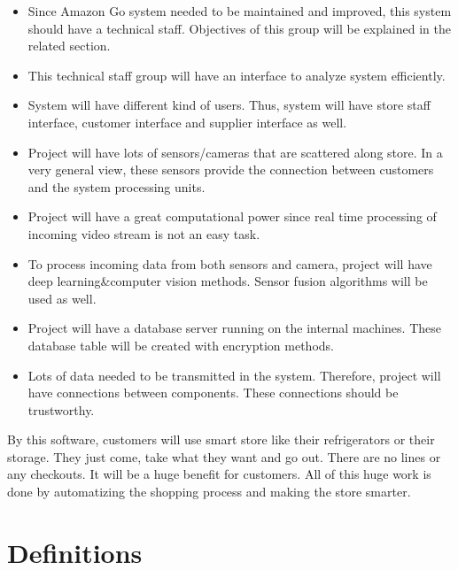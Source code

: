 \begin{itemize}
    \item Since Amazon Go system needed to be maintained and improved, this system should have a technical staff. Objectives of this group will be explained in the related section.
    \item This technical staff group will have an interface to analyze system efficiently.
    \item System will have different kind of users. Thus, system will have store staff interface, customer interface and supplier interface as well. 
    \item Project will have lots of sensors/cameras that are scattered along store. In a very general view, these sensors provide the connection between customers and the system processing units.
    \item Project will have a great computational power since real time processing of incoming video stream is not an easy task.
    \item To process incoming data from both sensors and camera, project will have deep learning\&computer vision methods. Sensor fusion algorithms will be used as well.
    \item Project will have a database server running on the internal machines. These database table will be created with encryption methods.
    \item Lots of data needed to be transmitted in the system. Therefore, project will have connections between components. These connections should be trustworthy.
\end{itemize}

By this software, customers will use smart store like their refrigerators or their storage. They just come, take what they want and go out. There are no lines or any checkouts. It will be a huge benefit for customers. All of this huge work is done by automatizing the shopping process and making the store smarter.



\section{Definitions}

